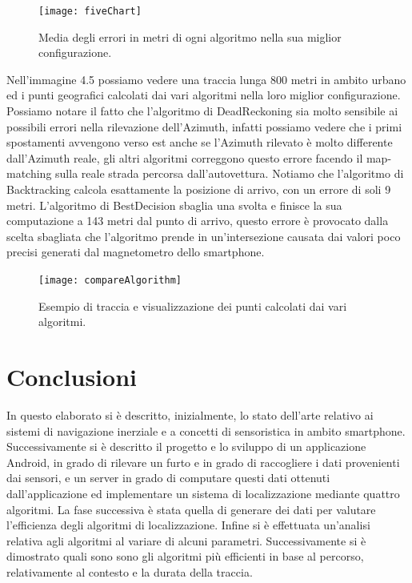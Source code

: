 \documentclass[12pt,a4paper,openright,twoside]{report}
\begin{document}
\begin{figure}[h]
\centering  
\texttt{[image: fiveChart]} 
\caption{Media degli errori in metri di ogni algoritmo nella sua miglior configurazione.} 

\end{figure}

Nell'immagine 4.5 possiamo vedere una traccia lunga 800 metri in ambito urbano ed i punti geografici calcolati dai vari algoritmi nella loro miglior configurazione. Possiamo notare il fatto che l'algoritmo di DeadReckoning sia molto sensibile ai possibili errori nella rilevazione dell'Azimuth, infatti possiamo vedere che i primi spostamenti avvengono verso est anche se l'Azimuth rilevato è molto differente dall'Azimuth reale, gli altri algoritmi correggono questo errore facendo il map-matching sulla reale strada percorsa dall'autovettura. Notiamo che l'algoritmo di Backtracking calcola esattamente la posizione di arrivo, con un errore di soli 9 metri. L'algoritmo di BestDecision sbaglia una svolta e finisce la sua computazione a 143 metri dal punto di arrivo, questo errore è provocato dalla scelta sbagliata che l'algoritmo prende in un'intersezione causata dai valori poco precisi generati dal magnetometro dello smartphone.

\begin{figure}[H]
\centering  
\texttt{[image: compareAlgorithm]} 
\caption{Esempio di traccia e visualizzazione dei punti calcolati dai vari algoritmi.} 
\end{figure}

\clearpage{\pagestyle{empty}\cleardoublepage}
\chapter*{Conclusioni}
In questo elaborato si è descritto, inizialmente, lo stato dell'arte relativo ai sistemi di navigazione inerziale e a concetti di sensoristica in ambito smartphone. Successivamente si è descritto il progetto e lo sviluppo di un applicazione Android, in grado di rilevare un furto e in grado di raccogliere i dati provenienti dai sensori, e un server in grado di computare questi dati ottenuti dall'applicazione ed implementare un sistema di localizzazione mediante quattro algoritmi. La fase successiva è stata quella di generare dei dati per valutare l'efficienza degli algoritmi di localizzazione. Infine si è effettuata un'analisi relativa agli algoritmi al variare di alcuni parametri. Successivamente si è dimostrato quali sono sono gli algoritmi più efficienti in base al percorso, relativamente al contesto e la durata della traccia.
\end{document}
